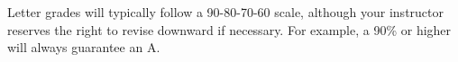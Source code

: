 \documentclass[margin,line,pifont,palatino,courier]{res}
\begin{document}
\begin{resume}
Letter grades will typically follow a 90-80-70-60 scale, although your instructor reserves the right to revise downward if necessary.  For example, a 90\% or higher will always guarantee an A.












\end{resume}
\end{document}

